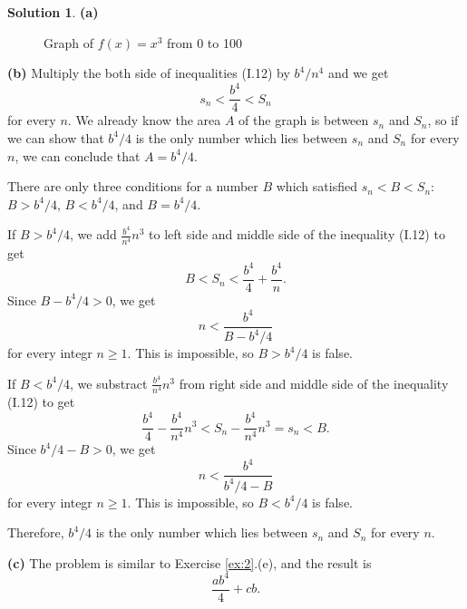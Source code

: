 \documentclass[11pt,a4paper]{book}
\theoremstyle{definition}
\newtheorem{solution}{Solution}
\begin{document}
\begin{solution}
  \textbf{(a)}
    \begin{figure}[H]
      \centering
      \caption*{Graph of $f(x)=x^3$ from 0 to 100}
    \end{figure}

  \vspace{2\baselineskip}
  \textbf{(b)}
  Multiply the both side of inequalities (I.12) by $b^4/n^4$ and we get
  \[
  s_n < \frac{b^4}{4} < S_n
  \]
  for every $n$. We already know the area $A$ of the graph is between $s_n$ and $S_n$, so if we can
  show that $b^4/4$ is the only number which lies between $s_n$ and $S_n$ for every $n$, we can conclude that $A = b^4/4$.

  There are only three conditions for a number $B$ which satisfied $s_n < B < S_n$: $B > b^4/4$, $B < b^4/4$, and $B = b^4/4$.

  If $B > b^4/4$, we add $\frac{b^4}{n^4}n^3$ to left side and middle side of the inequality (I.12) to get
  \[
  B < S_n < \frac{b^4}{4} + \frac{b^4}{n}.
  \]
  Since $B - b^4/4 > 0$, we get
  \[
  n < \frac{b^4}{B - b^4/4}
  \]
  for every integr $n \ge 1$. This is impossible, so $B > b^4/4$ is false.

  If $B < b^4/4$, we substract $\frac{b^4}{n^4}n^3$ from right side and middle side of the inequality (I.12) to get
  \[
  \frac{b^4}{4} - \frac{b^4}{n^4}n^3 < S_n - \frac{b^4}{n^4}n^3 = s_n < B.
  \]
  Since $b^4/4 - B > 0$, we get
  \[
  n < \frac{b^4}{b^4/4 - B}
  \]
  for every integr $n \ge 1$. This is impossible, so $B < b^4/4$ is false.

  Therefore, $b^4/4$ is the only number which lies between $s_n$ and $S_n$ for every $n$.

  \vspace{2\baselineskip}
  \textbf{(c)}
  The problem is similar to Exercise \ref{ex:2}.(e), and the result is
  \[
  \frac{ab^4}{4} + cb.
  \]
\end{solution}
\end{document}
